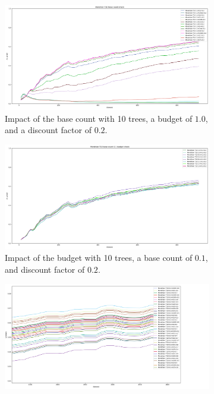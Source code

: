\begin{figure}
	 \centering
	 \begin{subfigure}[b]{0.49\textwidth}
		\centering
		\includegraphics[width=\textwidth]{figures/Banos_S1_shuf_Mondrian_T10_check.png}
		\caption{Impact of the base count with 10 trees, a budget of $1.0$, and a discount factor of $0.2$. } 
		\label{fig:mondrian-base-count}
	\end{subfigure}
	\hfill
	 \begin{subfigure}[b]{0.49\textwidth}
		 \centering
		 \includegraphics[width=\textwidth]{figures/Banos_S1_shuf_Mondrian_T10_bc_0.1_budget_check.png}
		 \caption{Impact of the budget with 10 trees, a base count of $0.1$, and discount factor of $0.2$.}
		 \label{fig:mondrian-budget}
	 \end{subfigure}
	 \hfill
	 \begin{subfigure}[b]{0.49\textwidth}
		 \centering
		 \includegraphics[width=\textwidth]{figures/Banos_S1_disount_check.png}

\end{subfigure}
\end{figure}
